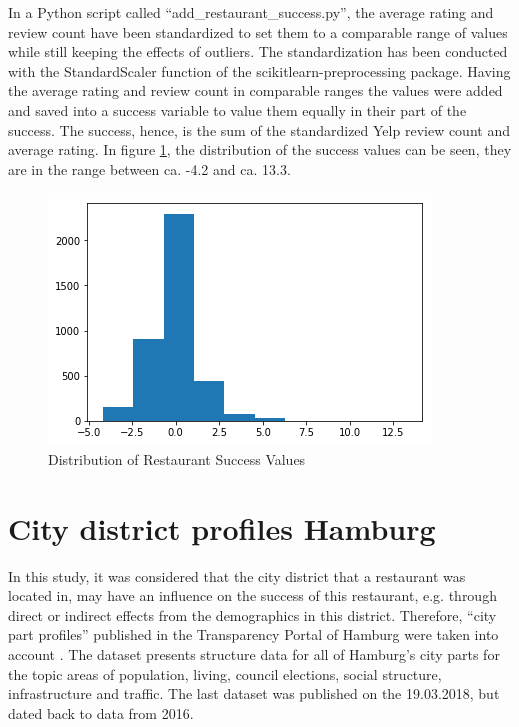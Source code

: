 \documentclass[a4paper, 11pt, oneside]{Thesis}  %
\begin{document}
In a Python script called ``add\_restaurant\_success.py'', the average rating and review count have been standardized to set them to a comparable range of values while still keeping the effects of outliers. The standardization has been conducted with the StandardScaler function of the scikitlearn-preprocessing package. Having the average rating and review count in comparable ranges the values were added and saved into a success variable to value them equally in their part of the success. The success, hence, is the sum of the standardized Yelp review count and average rating. In figure \ref{fig:restaurant_success_distribution}, the distribution of the success values can be seen, they are in the range between ca. -4.2 and ca. 13.3.

\begin{figure}[h]
\includegraphics[scale=0.5]{Figures/restaurant_success_distribution.png}
\centering
\caption{Distribution of Restaurant Success Values}
\label{fig:restaurant_success_distribution}
\end{figure}


\section{City district profiles Hamburg}
\label{district_profiles}

In this study, it was considered that the city district that a restaurant was located in, may have an influence on the success of this restaurant, e.g. through direct or indirect effects from the demographics in this district. Therefore, ``city part profiles'' published in the Transparency Portal of Hamburg were taken into account \cite{Profiles2018}. The dataset presents structure data for all of Hamburg's city parts for the topic areas of population, living, council elections, social structure, infrastructure and traffic. The last dataset was published on the 19.03.2018, but dated back to data from 2016.
\end{document}
